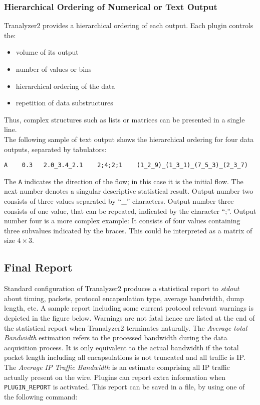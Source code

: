 \subsubsection{Hierarchical Ordering of Numerical or Text Output}
Tranalyzer2 provides a hierarchical ordering of each output. Each plugin controls the:
\begin{itemize}
\item volume of its output
\item number of values or bins
\item hierarchical ordering of the data
\item repetition of data substructures
\end{itemize}
Thus, complex structures such as lists or matrices can be presented in a single line.\\
The following sample of text output shows the hierarchical ordering for four data outputs, separated by tabulators:
\begin{figure*}[!ht]
\centering
\begin{lstlisting}
A    0.3   2.0_3.4_2.1    2;4;2;1    (1_2_9)_(1_3_1)_(7_5_3)_(2_3_7)
\end{lstlisting}
\end{figure*}

The {\tt A} indicates the direction of the flow; in this case it is the initial flow. The next number denotes a singular descriptive statistical result. Output number two consists of three values separated by ``\_'' characters. Output number three consists of one value, that can be repeated, indicated by the character ``;''. Output number four is a more complex example: It consists of four values containing three subvalues indicated by the braces. This could be interpreted as a matrix of size $4\times3$.

\subsection{Final Report}
Standard configuration of Tranalyzer2 produces a statistical report to {\em stdout} about timing, packets, protocol encapsulation type, average bandwidth, dump length, etc. A sample report including some current protocol relevant warnings is depicted in the figure below. Warnings are not fatal hence are listed at the end of the statistical report when Tranalyzer2 terminates naturally. The {\em Average total Bandwidth} estimation refers to the processed bandwidth during the data acquisition process. It is only equivalent to the actual bandwidth if the total packet length including all encapsulations is not truncated and all traffic is IP. The {\em Average IP Traffic Bandwidth} is an estimate comprising all IP traffic actually present on the wire. Plugins can report extra information when {\tt PLUGIN\_REPORT} is activated. This report can be saved in a file, by using one of the following command:

